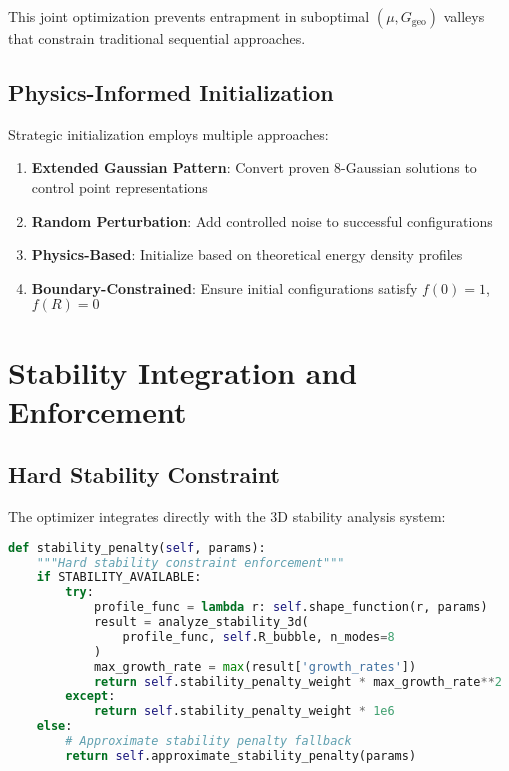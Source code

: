 \documentclass[11pt,a4paper]{article}
\begin{document}
This joint optimization prevents entrapment in suboptimal $(\mu, G_{\text{geo}})$ valleys that constrain traditional sequential approaches.

\subsection{Physics-Informed Initialization}

Strategic initialization employs multiple approaches:

\begin{enumerate}
\item \textbf{Extended Gaussian Pattern}: Convert proven 8-Gaussian solutions to control point representations
\item \textbf{Random Perturbation}: Add controlled noise to successful configurations
\item \textbf{Physics-Based}: Initialize based on theoretical energy density profiles
\item \textbf{Boundary-Constrained}: Ensure initial configurations satisfy $f(0) = 1$, $f(R) = 0$
\end{enumerate}

\section{Stability Integration and Enforcement}

\subsection{Hard Stability Constraint}

The optimizer integrates directly with the 3D stability analysis system:

\begin{lstlisting}[language=Python, caption=Stability Integration]
def stability_penalty(self, params):
    """Hard stability constraint enforcement"""
    if STABILITY_AVAILABLE:
        try:
            profile_func = lambda r: self.shape_function(r, params)
            result = analyze_stability_3d(
                profile_func, self.R_bubble, n_modes=8
            )
            max_growth_rate = max(result['growth_rates'])
            return self.stability_penalty_weight * max_growth_rate**2
        except:
            return self.stability_penalty_weight * 1e6
    else:
        # Approximate stability penalty fallback
        return self.approximate_stability_penalty(params)
\end{lstlisting}
\end{document}
